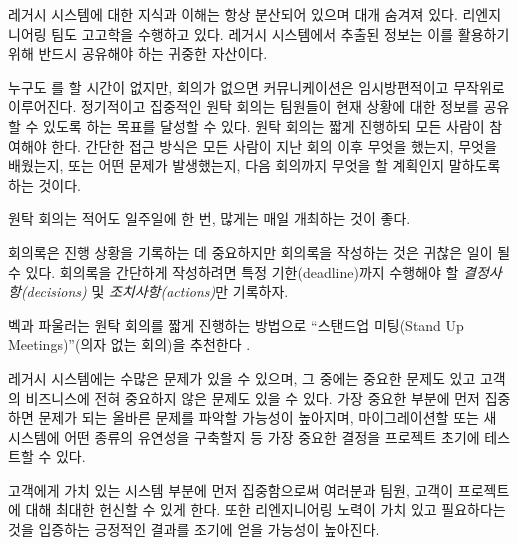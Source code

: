 \documentclass[a4paper,10pt,twoside]{book}
\begin{document}



\discussion
레거시 시스템에 대한 지식과 이해는 항상 분산되어 있으며 대개 숨겨져 있다. 리엔지니어링 팀도 고고학을 수행하고 있다. 레거시 시스템에서 추출된 정보는 이를 활용하기 위해 반드시 공유해야 하는 귀중한 자산이다.

누구도 를 할 시간이 없지만, 회의가 없으면 커뮤니케이션은 임시방편적이고 무작위로 이루어진다. 정기적이고 집중적인 원탁 회의는 팀원들이 현재 상황에 대한 정보를 공유할 수 있도록 하는 목표를 달성할 수 있다. 원탁 회의는 짧게 진행하되 모든 사람이 참여해야 한다. 간단한 접근 방식은 모든 사람이 지난 회의 이후 무엇을 했는지, 무엇을 배웠는지, 또는 어떤 문제가 발생했는지, 다음 회의까지 무엇을 할 계획인지 말하도록 하는 것이다.

원탁 회의는 적어도 일주일에 한 번, 많게는 매일 개최하는 것이 좋다.

회의록은 진행 상황을 기록하는 데 중요하지만 회의록을 작성하는 것은 귀찮은 일이 될 수 있다. 회의록을 간단하게 작성하려면 특정 기한(deadline)까지 수행해야 할 \emph{결정사항(decisions)} 및 \emph{조치사항(actions)}만 기록하자.

벡과 파울러는 원탁 회의를 짧게 진행하는 방법으로 ``스탠드업 미팅(Stand Up Meetings)''(의자 없는 회의)을 추천한다 \cite{Beck01a}.




\discussion
레거시 시스템에는 수많은 문제가 있을 수 있으며, 그 중에는 중요한 문제도 있고 고객의 비즈니스에 전혀 중요하지 않은 문제도 있을 수 있다. 가장 중요한 부분에 먼저 집중하면 문제가 되는 올바른 문제를 파악할 가능성이 높아지며, 마이그레이션할  또는 새 시스템에 어떤 종류의 유연성을 구축할지 등 가장 중요한 결정을 프로젝트 초기에 테스트할 수 있다.

고객에게 가치 있는 시스템 부분에 먼저 집중함으로써 여러분과 팀원, 고객이 프로젝트에 대해 최대한 헌신할 수 있게 한다. 또한 리엔지니어링 노력이 가치 있고 필요하다는 것을 입증하는 긍정적인 결과를 조기에 얻을 가능성이 높아진다.
\end{document}
